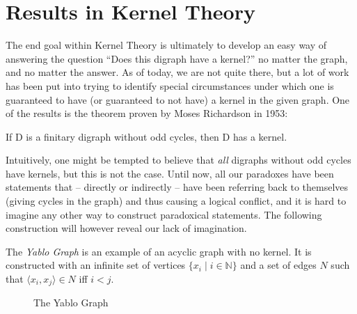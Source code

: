 \section{Results in Kernel Theory}
\label{sec:Results in Kernel Theory}
The end goal within Kernel Theory is ultimately to develop an easy way of answering the question ``Does this digraph have a kernel?'' no matter the graph, and no matter the answer.
As of today, we are not quite there, but a lot of work has been put into trying to identify special circumstances under which one is guaranteed to have (or guaranteed to not have) a kernel in the given graph.
One of the results is the theorem proven by Moses Richardson in 1953:
\begin{theorem}
  If D is a finitary digraph without odd cycles, then D has a kernel.
\end{theorem}
Intuitively, one might be tempted to believe that \textit{all} digraphs without odd cycles have kernels, but this is not the case.
Until now, all our paradoxes have been statements that -- directly or indirectly -- have been referring back to themselves (giving cycles in the graph) and thus causing a logical conflict, and it is hard to imagine any other way to construct paradoxical statements.
The following construction will however reveal our lack of imagination.

The \textit{Yablo Graph}\cite{analysis-yablo} is an example of an acyclic graph with no kernel.
It is constructed with an infinite set of vertices $\{ x_i \;|\; i \in \mathbb{N} \}$ and a set of edges $N$ such that $\langle x_i, x_j \rangle \in N$ iff $i < j$.

\begin{figure}[!h]
  \centering
  \caption{The Yablo Graph}
  \label{fig:yablo-graph}
\end{figure}

